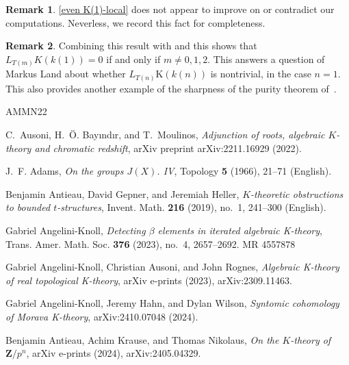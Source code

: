 \documentclass[english,10pt]{amsart}
\theoremstyle{definition}
\newtheorem{rem}{Remark}[section]
\numberwithin{equation}{section}
\begin{document}
\begin{rem}
\autoref{even K(1)-local} does not appear to improve on or contradict our computations.  Neverless, we record this fact for completeness. 
\end{rem}

\begin{rem}
Combining this result with \cite[Corollary~D~(a)]{land2020purity} and \cite[Theorem~4.4.6]{angelini2024syntomic} this shows that $L_{T(m)}K(k(1))=0$ if and only if $m\ne 0,1,2$. This answers a question of Markus Land about whether $L_{T(n)}\mathrm{K}(k(n))$ is nontrivial, in the case $n=1$. This also provides another example of the sharpness of the purity theorem of~\cite{land2020purity}. 
\end{rem}

{\providecommand{\bysame}{\leavevmode\hbox to3em{\hrulefill}\thinspace}
\providecommand{\MR}{\relax\ifhmode\unskip\space\fi MR }
\providecommand{\MRhref}[2]{%
  \href{http://www.ams.org/mathscinet-getitem?mr=#1}{#2}
}
\providecommand{\href}[2]{#2}
\begin{thebibliography}{AMMN22}

C.~Ausoni, H.~{\"O}. Bay{\i}nd{\i}r, and T.~Moulinos, \emph{Adjunction of roots, algebraic {$ K $}-theory and chromatic redshift}, arXiv preprint arXiv:2211.16929 (2022).

J.~F. Adams, \emph{On the groups {{\(J(X)\)}}. {IV}}, Topology \textbf{5} (1966), 21--71 (English).

Benjamin Antieau, David Gepner, and Jeremiah Heller, \emph{{$K$}-theoretic obstructions to bounded {$t$}-structures}, Invent. Math. \textbf{216} (2019), no.~1, 241--300 (English).

Gabriel Angelini-Knoll, \emph{Detecting {$\beta$} elements in iterated algebraic {K}-theory}, Trans. Amer. Math. Soc. \textbf{376} (2023), no.~4, 2657--2692. \MR{4557878}

Gabriel Angelini-Knoll, Christian {Ausoni}, and John {Rognes}, \emph{{Algebraic K-theory of real topological K-theory}}, arXiv e-prints (2023), arXiv:2309.11463.

Gabriel Angelini-Knoll, Jeremy Hahn, and Dylan Wilson, \emph{Syntomic cohomology of {M}orava {K}-theory}, arXiv:2410.07048 (2024).

Benjamin {Antieau}, Achim {Krause}, and Thomas {Nikolaus}, \emph{On the {$K$}-theory of {$\mathbf{Z}/p^n$}}, arXiv e-prints (2024), arXiv:2405.04329.


\end{thebibliography}}
\end{document}
